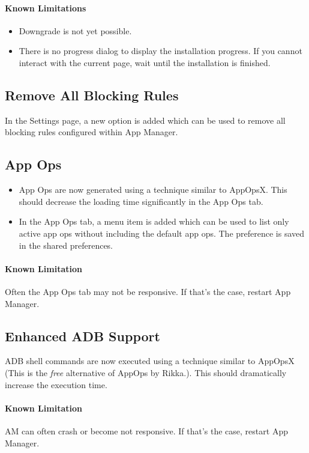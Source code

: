 \paragraph{Known Limitations}
\begin{itemize}
    \item Downgrade is not yet possible.
    \item There is no progress dialog to display the installation progress. If you cannot interact with the current page,
    wait until the installation is finished.
\end{itemize}

\subsection{Remove All Blocking Rules}
In the Settings page, a new option is added which can be used to remove all blocking rules configured within App Manager.

\subsection{App Ops}
\begin{itemize}
    \item App Ops are now generated using a technique similar to AppOpsX. This should decrease the loading time
    significantly in the App Ops tab.
    \item In the App Ops tab, a menu item is added which can be used to list only active app ops without including the
    default app ops. The preference is saved in the shared preferences.
\end{itemize}

\paragraph{Known Limitation} Often the App Ops tab may not be responsive. If that's the case, restart App Manager.

\subsection{Enhanced ADB Support}
ADB shell commands are now executed using a technique similar to AppOpsX (This is the \textit{free} alternative of AppOps by Rikka.).
This should dramatically increase the execution time.

\paragraph{Known Limitation} AM can often crash or become not responsive. If that's the case, restart App Manager.

